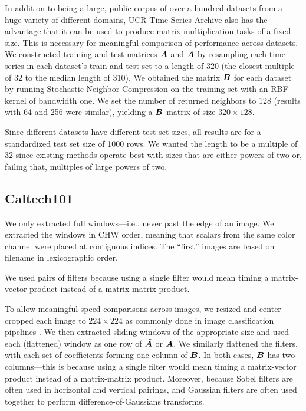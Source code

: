 In addition to being a large, public corpus of over a hundred datasets from a huge variety of different domains, UCR Time Series Archive also has the advantage that it can be used to produce matrix multiplication tasks of a fixed size. This is necessary for meaningful comparison of performance across datasets. We constructed training and test matrices $\tilde{\bm{A}}$ and $\bm{A}$ by resampling each time series in each dataset's train and test set to a length of $320$ (the closest multiple of 32 to the median length of 310). We obtained the matrix $\bm{B}$ for each dataset by running Stochastic Neighbor Compression \cite{snc} on the training set with an RBF kernel of bandwidth one. We set the number of returned neighbors to 128 (results with 64 and 256 were similar), yielding a $\bm{B}$ matrix of size $320 \times 128$. %

Since different datasets have different test set sizes, all results are for a standardized test set size of 1000 rows. We wanted the length to be a multiple of 32 since existing methods operate best with sizes that are either powers of two or, failing that, multiples of large powers of two.




\subsection{Caltech101}

We only extracted full windows---i.e., never past the edge of an image. We extracted the windows in CHW order, meaning that scalars from the same color channel were placed at contiguous indices. The ``first'' images are based on filename in lexicographic order.

We used pairs of filters because using a single filter would mean timing a matrix-vector product instead of a matrix-matrix product.

To allow meaningful speed comparisons across images, we resized and center cropped each image to $224 \times 224$ as commonly done in image classification pipelines \cite{resNet,resnet2,densenet}. We then extracted sliding windows of the appropriate size and used each (flattened) window as one row of $\tilde{\bm{A}}$ or $\bm{A}$. We similarly flattened the filters, with each set of coefficients forming one column of $\bm{B}$. In both cases, $\bm{B}$ has two columns---this is because using a single filter would mean timing a matrix-vector product instead of a matrix-matrix product. Moreover, because Sobel filters are often used in horizontal and vertical pairings, and Gaussian filters are often used together to perform difference-of-Gaussians transforms.

